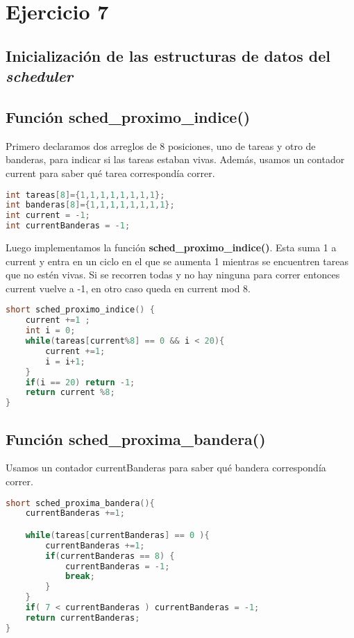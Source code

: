 \section{Ejercicio 7}
\par{}

\subsection*{Inicialización de las estructuras de datos del \textit{scheduler}}
\par{}


\subsection*{Función sched\_proximo\_indice()}
\par{Primero declaramos dos arreglos de 8 posiciones, uno de tareas y otro de banderas, para indicar si las tareas estaban vivas. Además, usamos un contador current para saber qué tarea correspondía correr.}
\begin{lstlisting}[language={C}]
int tareas[8]={1,1,1,1,1,1,1,1};
int banderas[8]={1,1,1,1,1,1,1,1};
int current = -1;
int currentBanderas = -1;
\end{lstlisting}

\par{Luego implementamos la función \textbf{sched\_proximo\_indice()}. Esta suma 1 a current y entra en un ciclo en el que se aumenta 1 mientras se encuentren tareas que no estén vivas. Si se recorren todas y no hay ninguna para correr entonces current vuelve a -1, en otro caso queda en current mod 8.}
\begin{lstlisting}[language={C}]
short sched_proximo_indice() {
	current +=1 ;
	int i = 0;
	while(tareas[current%8] == 0 && i < 20){
		current +=1;
		i = i+1;
	}
	if(i == 20) return -1;
	return current %8;
}
\end{lstlisting}

\subsection*{Función sched\_proxima\_bandera()}
\par{Usamos un contador currentBanderas para saber qué bandera correspondía correr.}
\begin{lstlisting}[language={C}]
short sched_proxima_bandera(){
	currentBanderas +=1;

	while(tareas[currentBanderas] == 0 ){
		currentBanderas +=1;
		if(currentBanderas == 8) {
			currentBanderas = -1;
			break;
		}
	}
	if( 7 < currentBanderas ) currentBanderas = -1;
	return currentBanderas;
}
\end{lstlisting}

\clearpage